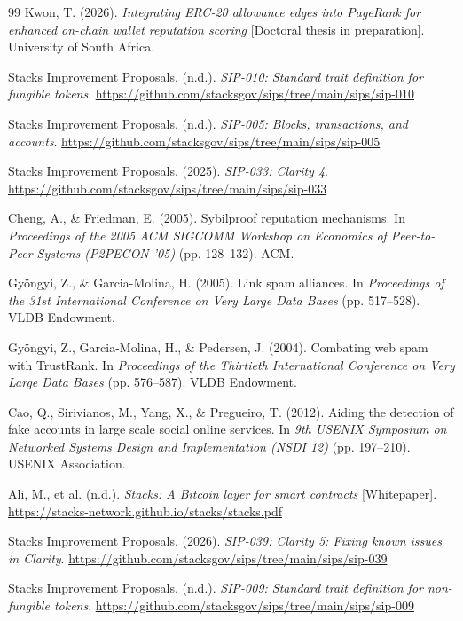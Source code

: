 \begin{thebibliography}{99}
 Kwon, T. (2026). \textit{Integrating ERC-20 allowance edges into PageRank for enhanced on-chain wallet reputation scoring} [Doctoral thesis in preparation]. University of South Africa.

 Stacks Improvement Proposals. (n.d.). \textit{SIP-010: Standard trait definition for fungible tokens}. \url{https://github.com/stacksgov/sips/tree/main/sips/sip-010}

 Stacks Improvement Proposals. (n.d.). \textit{SIP-005: Blocks, transactions, and accounts}. \url{https://github.com/stacksgov/sips/tree/main/sips/sip-005}

 Stacks Improvement Proposals. (2025). \textit{SIP-033: Clarity 4}. \url{https://github.com/stacksgov/sips/tree/main/sips/sip-033}

 Cheng, A., \& Friedman, E. (2005). Sybilproof reputation mechanisms. In \textit{Proceedings of the 2005 ACM SIGCOMM Workshop on Economics of Peer-to-Peer Systems (P2PECON '05)} (pp. 128--132). ACM.

 Gy\"{o}ngyi, Z., \& Garcia-Molina, H. (2005). Link spam alliances. In \textit{Proceedings of the 31st International Conference on Very Large Data Bases} (pp. 517--528). VLDB Endowment.

 Gy\"{o}ngyi, Z., Garcia-Molina, H., \& Pedersen, J. (2004). Combating web spam with TrustRank. In \textit{Proceedings of the Thirtieth International Conference on Very Large Data Bases} (pp. 576--587). VLDB Endowment.

 Cao, Q., Sirivianos, M., Yang, X., \& Pregueiro, T. (2012). Aiding the detection of fake accounts in large scale social online services. In \textit{9th USENIX Symposium on Networked Systems Design and Implementation (NSDI 12)} (pp. 197--210). USENIX Association.

 Ali, M., et al. (n.d.). \textit{Stacks: A Bitcoin layer for smart contracts} [Whitepaper]. \url{https://stacks-network.github.io/stacks/stacks.pdf}

 Stacks Improvement Proposals. (2026). \textit{SIP-039: Clarity 5: Fixing known issues in Clarity}. \url{https://github.com/stacksgov/sips/tree/main/sips/sip-039}

 Stacks Improvement Proposals. (n.d.). \textit{SIP-009: Standard trait definition for non-fungible tokens}. \url{https://github.com/stacksgov/sips/tree/main/sips/sip-009}


\end{thebibliography}
